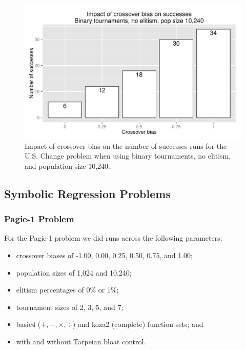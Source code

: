 \documentclass{sig-alternate}
\begin{document}
\begin{figure}
\centering
\includegraphics[width=0.45 \textwidth]{Plots/US_change_successes_strong.pdf}
\caption{Impact of crossover bias on the number of successes runs for the U.S. Change problem when using binary
tournaments, no elitism, and population size 10,240.}
\label{fig:USChange_Successes_strong}
\end{figure}

%
%
%
%


\subsection{Symbolic Regression Problems}

\subsubsection{Pagie-1 Problem}

For the Pagie-1 problem we did runs across the following parameters:

\begin{itemize}
	\item crossover biases of -1.00, 0.00, 0.25, 0.50, 0.75, and 1.00;
	\item population sizes of 1,024 and 10,240;
	\item elitism percentages of 0\% or 1\%;
	\item tournament sizes of 2, 3, 5, and 7;
	\item basic4 ($+, -, \times, \div$) and koza2 (complete) function sets; and
	\item with and without Tarpeian bloat control.
\end{itemize}
\end{document}

